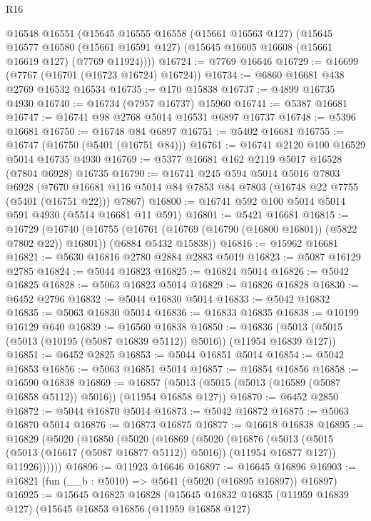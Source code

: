 \begin{lexlean}{R16}
\begin{coremodule}
    @16548
    @16551
    (@15645
      @16555
      @16558
      (@15661 @16563 @127)
      (@15645
        @16577
        @16580
        (@15661 @16591 @127)
        (@15645 @16605 @16608 (@15661 @16619 @127) (@7769 @11924))))
@16724 := @7769 @16646
@16729 := @16699 (@7767 (@16701 (@16723 @16724) @16724))
@16734 := @6860 @16681 @438 @2769 @16532 @16534
@16735 := @170 @15838
@16737 := @4899 @16735 @4930
@16740 := @16734 (@7957 @16737) @15960
@16741 := @5387 @16681
@16747 := @16741 @98 @2768 @5014 @16531 @6897 @16737
@16748 := @5396 @16681
@16750 := @16748 @84 @6897
@16751 := @5402 @16681
@16755 := @16747 (@16750 (@5401 (@16751 @84)))
@16761 := @16741 @2120 @100 @16529 @5014 @16735 @4930
@16769 := @5377 @16681 @162 @2119 @5017 @16528 (@7804 @6928) @16735
@16790 := @16741
    @245
    @594
    @5014
    @5016
    @7803
    @6928
    (@7670 @16681 @116 @5014 @84 @7853 @84 @7803 (@16748 @22 @7755 (@5401 (@16751 @22))) @7867)
@16800 := @16741 @592 @100 @5014 @5014 @591 @4930 (@5514 @16681 @11 @591)
@16801 := @5421 @16681
@16815 := @16729
    (@16740
      (@16755 (@16761 (@16769 (@16790 (@16800 @16801)) (@5822 @7802 @22)) @16801))
      (@6884 @5432 @15838))
@16816 := @15962 @16681
@16821 := @5630 @16816 @2780 @2884 @2883 @5019
@16823 := @5087 @16129 @2785
@16824 := @5044 @16823
@16825 := @16824 @5014
@16826 := @5042 @16825
@16828 := @5063 @16823 @5014
@16829 := @16826 @16828
@16830 := @6452 @2796
@16832 := @5044 @16830 @5014
@16833 := @5042 @16832
@16835 := @5063 @16830 @5014
@16836 := @16833 @16835
@16838 := @10199 @16129 @640
@16839 := @16560 @16838
@16850 := @16836 (@5013 (@5015 (@5013 (@10195 (@5087 @16839 @5112)) @5016)) (@11954 @16839 @127))
@16851 := @6452 @2825
@16853 := @5044 @16851 @5014
@16854 := @5042 @16853
@16856 := @5063 @16851 @5014
@16857 := @16854 @16856
@16858 := @16590 @16838
@16869 := @16857 (@5013 (@5015 (@5013 (@16589 (@5087 @16858 @5112)) @5016)) (@11954 @16858 @127))
@16870 := @6452 @2850
@16872 := @5044 @16870 @5014
@16873 := @5042 @16872
@16875 := @5063 @16870 @5014
@16876 := @16873 @16875
@16877 := @16618 @16838
@16895 := @16829
    (@5020
      (@16850
        (@5020
          (@16869
            (@5020
              (@16876
                (@5013 (@5015 (@5013 (@16617 (@5087 @16877 @5112)) @5016)) (@11954 @16877 @127))
                @11926))))))
@16896 := @11923 @16646
@16897 := @16645 @16896
@16903 := @16821 (fun (__b : @5010) => @5641 (@5020 (@16895 @16897)) @16897)
@16925 := @15645
    @16825
    @16828
    (@15645
      @16832
      @16835
      (@11959 @16839 @127)
      (@15645
        @16853
        @16856
        (@11959 @16858 @127)

\end{coremodule}
\end{lexlean}
